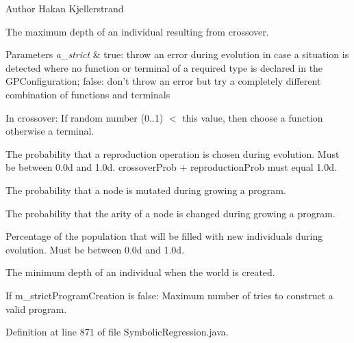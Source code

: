 \begin{DoxyAuthor}{Author}
Hakan Kjellerstrand 
\end{DoxyAuthor}
The maximum depth of an individual resulting from crossover.


\begin{DoxyParams}{Parameters}
{\em a\-\_\-strict} & true\-: throw an error during evolution in case a situation is detected where no function or terminal of a required type is declared in the G\-P\-Configuration; false\-: don't throw an error but try a completely different combination of functions and terminals\\
\hline
\end{DoxyParams}
In crossover\-: If random number (0..1) $<$ this value, then choose a function otherwise a terminal.

The probability that a reproduction operation is chosen during evolution. Must be between 0.\-0d and 1.\-0d. crossover\-Prob + reproduction\-Prob must equal 1.\-0d.

The probability that a node is mutated during growing a program.

The probability that the arity of a node is changed during growing a program.

Percentage of the population that will be filled with new individuals during evolution. Must be between 0.\-0d and 1.\-0d.

The minimum depth of an individual when the world is created.

If m\-\_\-strict\-Program\-Creation is false\-: Maximum number of tries to construct a valid program.

Definition at line 871 of file Symbolic\-Regression.\-java.



